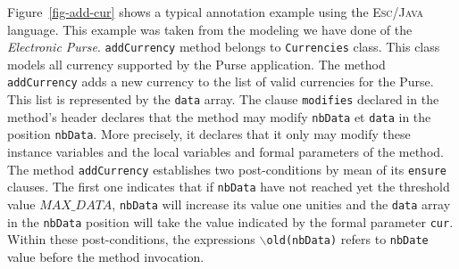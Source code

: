 \documentclass[a4paper]{llncs}
\begin{document}



Figure~\ref{fig-add-cur} shows a typical annotation example using the
\textsc{Esc/Java} language. This example was taken from the modeling 
we have done of the \textit{Electronic Purse}. \texttt{addCurrency}
method belongs to \texttt{Currencies} class. This class models all
currency supported by the Purse application. The method
\texttt{addCurrency} adds a new currency to the list of valid
currencies for the Purse. This list is represented by the
\texttt{data} array. The clause
\texttt{modifies} declared in the method's header declares
that the method may modify \texttt{nbData} et
\texttt{data} in the position \texttt{nbData}. More precisely, it
declares that it only may modify these instance variables and the local
variables and formal parameters of the method. The method
\texttt{addCurrency} establishes
two post-conditions by mean of its \texttt{ensure} clauses. The first
one indicates that if \texttt{nbData} have not reached yet the threshold
value $MAX\_DATA$, \texttt{nbData} will increase its value one
unities and the \texttt{data} array in the \texttt{nbData} position
will take the value indicated by the formal parameter
\texttt{cur}. Within these post-conditions, the expressions
\texttt{$\backslash$old(nbData)} refers to \texttt{nbDate} value
before the method invocation.
\end{document}
